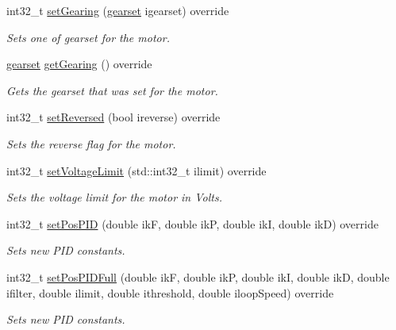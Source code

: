 \begin{DoxyCompactItemize}
int32\+\_\+t \mbox{\hyperlink{classokapi_1_1ThreadedMockMotor_aceeda6e1bf51f5c971c52b2528c48319}{set\+Gearing}} (\mbox{\hyperlink{classokapi_1_1AbstractMotor_a88aaa6ea2fa10f5520a537bbf26774d5}{gearset}} igearset) override
\begin{DoxyCompactList}\small\item\em Sets one of gearset for the motor. \end{DoxyCompactList}\item 
\mbox{\hyperlink{classokapi_1_1AbstractMotor_a88aaa6ea2fa10f5520a537bbf26774d5}{gearset}} \mbox{\hyperlink{classokapi_1_1ThreadedMockMotor_acbc36f09b40e1d8c18bbefec6b8ad86d}{get\+Gearing}} () override
\begin{DoxyCompactList}\small\item\em Gets the gearset that was set for the motor. \end{DoxyCompactList}\item 
int32\+\_\+t \mbox{\hyperlink{classokapi_1_1ThreadedMockMotor_ab5ad496fc010d262d61353b72966adf2}{set\+Reversed}} (bool ireverse) override
\begin{DoxyCompactList}\small\item\em Sets the reverse flag for the motor. \end{DoxyCompactList}\item 
int32\+\_\+t \mbox{\hyperlink{classokapi_1_1ThreadedMockMotor_a60f92b2a7c53f51dd0295f7d1bb172f9}{set\+Voltage\+Limit}} (std\+::int32\+\_\+t ilimit) override
\begin{DoxyCompactList}\small\item\em Sets the voltage limit for the motor in Volts. \end{DoxyCompactList}\item 
int32\+\_\+t \mbox{\hyperlink{classokapi_1_1ThreadedMockMotor_ac66ffc5e0c044149211368250cd0cb98}{set\+Pos\+P\+ID}} (double ikF, double ikP, double ikI, double ikD) override
\begin{DoxyCompactList}\small\item\em Sets new P\+ID constants. \end{DoxyCompactList}\item 
int32\+\_\+t \mbox{\hyperlink{classokapi_1_1ThreadedMockMotor_a4e2bd8827976d4c4e6824f696cb89719}{set\+Pos\+P\+I\+D\+Full}} (double ikF, double ikP, double ikI, double ikD, double ifilter, double ilimit, double ithreshold, double iloop\+Speed) override
\begin{DoxyCompactList}\small\item\em Sets new P\+ID constants. \end{DoxyCompactList}\item 

\end{DoxyCompactItemize}
